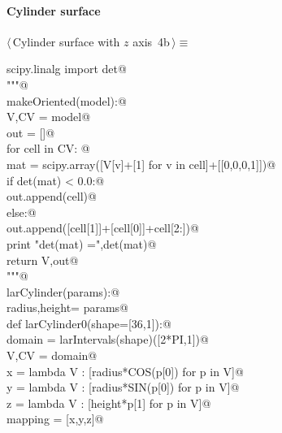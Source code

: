 \documentclass[11pt,oneside]{article}	%
\begin{document}
\paragraph{Cylinder surface}
\begin{flushleft} \small \label{scrap8}
\protect{}$\langle\,$Cylinder surface with $z$ axis\nobreak\ {\footnotesize 4b}$\,\rangle\equiv$
\vspace{-1ex}
\begin{list}{}{} \item
\mbox{}\verb@from scipy.linalg import det@\\
\mbox{}\verb@"""@\\
\mbox{}\verb@def makeOriented(model):@\\
\mbox{}\verb@   V,CV = model@\\
\mbox{}\verb@   out = []@\\
\mbox{}\verb@   for cell in CV: @\\
\mbox{}\verb@      mat = scipy.array([V[v]+[1] for v in cell]+[[0,0,0,1]])@\\
\mbox{}\verb@      if det(mat) < 0.0:@\\
\mbox{}\verb@         out.append(cell)@\\
\mbox{}\verb@      else:@\\
\mbox{}\verb@         out.append([cell[1]]+[cell[0]]+cell[2:])@\\
\mbox{}\verb@      print "\n det(mat) =",det(mat)@\\
\mbox{}\verb@   return V,out@\\
\mbox{}\verb@"""@\\
\mbox{}\verb@def larCylinder(params):@\\
\mbox{}\verb@   radius,height= params@\\
\mbox{}\verb@   def larCylinder0(shape=[36,1]):@\\
\mbox{}\verb@      domain = larIntervals(shape)([2*PI,1])@\\
\mbox{}\verb@      V,CV = domain@\\
\mbox{}\verb@      x = lambda V : [radius*COS(p[0]) for p in V]@\\
\mbox{}\verb@      y = lambda V : [radius*SIN(p[0]) for p in V]@\\
\mbox{}\verb@      z = lambda V : [height*p[1] for p in V]@\\
\mbox{}\verb@      mapping = [x,y,z]@\\

\end{list}
\end{flushleft}
\end{document}
